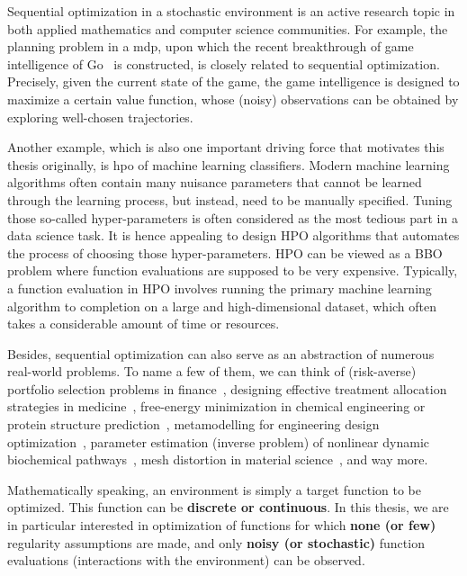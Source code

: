 Sequential optimization in a stochastic environment is an active research topic in both applied mathematics and computer science communities. For example, the planning problem in a \gls{mdp}, upon which the recent breakthrough of game intelligence of Go~\citep{silver2016alphago} is constructed, is closely related to sequential optimization. Precisely, given the current state of the game, the game intelligence is designed to maximize a certain value function, whose (noisy) observations can be obtained by exploring well-chosen trajectories.

Another example, which is also one important driving force that motivates this thesis originally, is \gls{hpo} of machine learning classifiers. Modern machine learning algorithms often contain many nuisance parameters that cannot be learned through the learning process, but instead, need to be manually specified. Tuning those so-called \gls{hyper-parameters} is often considered as the most tedious part in a data science task. It is hence appealing to design HPO algorithms that automates the process of choosing those hyper-parameters. HPO can be viewed as a BBO problem where function evaluations are supposed to be very expensive. Typically, a function evaluation in HPO involves running the primary machine learning algorithm to completion on a large and high-dimensional dataset, which often takes a considerable amount of time or resources.

Besides, sequential optimization can also serve as an abstraction of numerous real-world problems. To name a few of them, we can think of (risk-averse) portfolio selection problems in finance~\citep{ziemba2010}, designing effective treatment allocation strategies in medicine~\citep{durand2018contextual}, free-energy minimization in chemical engineering or protein structure prediction~\citep{floudas2000}, metamodelling for engineering design optimization~\citep{wang2007}, parameter estimation (inverse problem) of nonlinear dynamic biochemical pathways~\citep{moles2003}, mesh distortion in material science~\citep{charpagne2019ebsd}, and way more. 

Mathematically speaking, an environment is simply a target function to be optimized. This function can be \textbf{discrete or continuous}. In this thesis, we are in particular interested in optimization of functions for which \textbf{none (or few)} regularity assumptions are made, and only \textbf{noisy (or stochastic)} function evaluations (interactions with the environment) can be observed.

